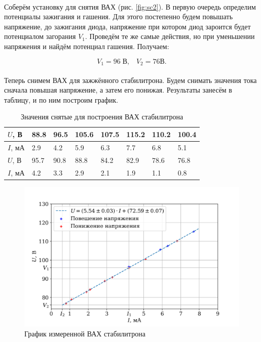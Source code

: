 \documentclass[a4paper,12pt]{article} %
\begin{document}
\paragraph{} Соберём установку для снятия ВАХ (рис. \ref{fig:sc2}). В первую очередь определим потенциалы зажигания и гашения. Для этого постепенно будем повышать напряжение, до зажигания диода, напряжение при котором диод зароится будет потенциалом загорания $V_1$. Проведём те же самые действия, но при уменьшении напряжения и найдём потенциал гашения. Получаем:

\[ V_1 = 96 \; \text{В}, \;\;\; V_2 = 76 \text{В} .\]

\paragraph{} Теперь снимем ВАХ для зажжённого стабилитрона. Будем снимать значения тока сначала повышая напряжение, а затем его понижая. Результаты занесём в таблицу, и по ним построим график.

\begin{table}[h]
\begin{center}
\begin{tabularx}{\textwidth}{|Y||X|X|X|X|X|X|X|}
\hline 
$U$, В & 88.8 & 96.5 & 105.6 & 107.5 & 115.2 & 110.2 & 100.4 \\ 
\hline 
$I$, мА & 2.9 & 4.2 & 5.9 & 6.3 & 7.7 & 6.8 & 5.1 \\ 
\hline 
$U$, В & 95.7 & 90.8 & 88.8 & 84.2 & 82.9 & 78.6 & 76.8 \\ 
\hline 
$I$, мА & 4.2 & 3.3 & 2.9 & 2.1 & 1.9 & 1.1 & 0.8 \\ 
\hline 
\end{tabularx}
\label{tab1}
\caption{Значения снятые для построения ВАХ стабилитрона} 
\end{center}
\end{table}

\begin{figure}
\begin{center}
\includegraphics[width=1\textwidth]{plot1.png}
\caption{График измеренной ВАХ стабилитрона}
\label{fig:1}
\end{center}
\end{figure}
\end{document}
